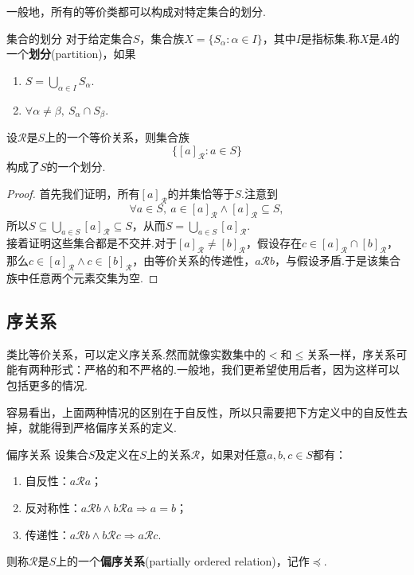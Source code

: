 \documentclass[lang=cn, zihao=5]{elegantbook}
\begin{document}
一般地，所有的等价类都可以构成对特定集合的划分.

\begin{definition}{集合的划分}
	对于给定集合$S$，集合族$X=\{ S_{\alpha} : \alpha \in I \}$，其中$I$是指标集.称$X$是$A$的一个\textbf{划分}(partition)，如果
	\begin{enumerate}
		\item $S = \bigcup_{\alpha \in I} S_{\alpha}$.
		\item $\forall \alpha \neq \beta ,~S_{\alpha} \cap S_{\beta}$.
	\end{enumerate}
\end{definition}

\begin{theorem}
	设$\mathcal{R}$是$S$上的一个等价关系，则集合族$$\{ [a]_{\mathcal{R}}:a \in S \}$$构成了$S$的一个划分.
\end{theorem}
\begin{proof}
	首先我们证明，所有$[a]_{\mathcal{R}}$的并集恰等于$S$.注意到$$\forall a \in S,~a \in [a]_{\mathcal{R}} \wedge [a]_{\mathcal{R}} \subseteq S,$$
	所以$S \subseteq \bigcup_{a \in S} [a]_{\mathcal{R}} \subseteq S$，从而$S = \bigcup_{a \in S} [a]_{\mathcal{R}}$. \\
	接着证明这些集合都是不交并.对于$[a]_{\mathcal{R}} \neq [b]_{\mathcal{R}}$，假设存在$c \in [a]_{\mathcal{R}} \cap [b]_{\mathcal{R}}$，那么$c \in [a]_{\mathcal{R}} \wedge c \in [b]_{\mathcal{R}}$，由等价关系的传递性，$a\mathcal{R}b$，与假设矛盾.于是该集合族中任意两个元素交集为空.
\end{proof}

\subsection{序关系}

类比等价关系，可以定义序关系.然而就像实数集中的$<$和$\leq$关系一样，序关系可能有两种形式：严格的和不严格的.一般地，我们更希望使用后者，因为这样可以包括更多的情况.

容易看出，上面两种情况的区别在于自反性，所以只需要把下方定义中的自反性去掉，就能得到严格偏序关系的定义.

\begin{definition}{偏序关系}
	设集合$S$及定义在$S$上的关系$\mathcal{R}$，如果对任意$a,b,c \in S$都有：
	\begin{enumerate}
		\item 自反性：$a\mathcal{R} a$；
		\item 反对称性：$a\mathcal{R} b \wedge b\mathcal{R} a \Rightarrow a=b$；
		\item 传递性：$a\mathcal{R} b \wedge b\mathcal{R} c \Rightarrow a\mathcal{R} c$.
	\end{enumerate}
	则称$\mathcal{R}$是$S$上的一个\textbf{偏序关系}(partially ordered relation)，记作$\preceq$.
\end{definition}
\end{document}
